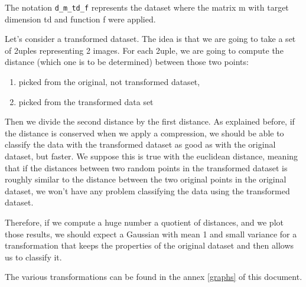 \documentclass[11pt,a4paper]{article}
\begin{document}
		
	The notation \texttt{d\_m\_td\_f} represents the dataset where the matrix m with target dimension td and function f were applied.
	
	Let's consider a transformed dataset. The idea is that we are going to take a set of 2uples representing 2 images. For each 2uple, we are going to compute the distance (which one is to be determined) between those two points:
	
	\begin{enumerate}
		\item picked from the original, not transformed dataset,
		\item picked from the transformed data set
	\end{enumerate}


	
	
	Then we divide the second distance by the first distance. As explained before, if the distance is conserved when we apply a compression, we should be able to classify the data with the transformed dataset as good as with the original dataset, but faster. We suppose this is true with the euclidean distance, meaning that if the distances between two random points in the transformed dataset is roughly similar to the distance between the two original points in the original dataset, we won't have any problem classifying the data using the transformed dataset.
	
	
	Therefore, if we compute a huge number a quotient of distances, and we plot those results, we should expect a Gaussian with mean 1 and small variance for a transformation that keeps the properties of the original dataset and then allows us to classify it.
	
	The various transformations can be found in the annex \ref{graphs} of this document.
	
	
%	
	
%	
\end{document}
